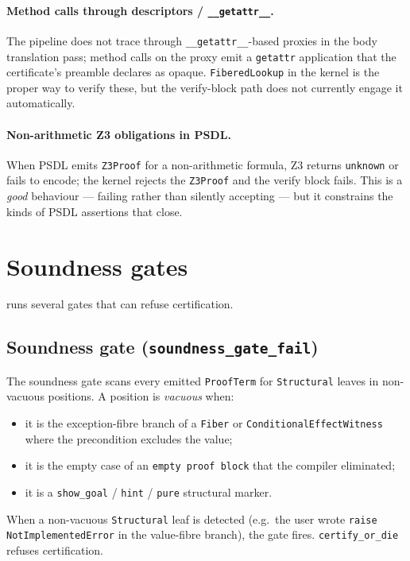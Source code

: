 \paragraph{Method calls through descriptors / \texttt{\_\_getattr\_\_}.}
The pipeline does not trace through \texttt{\_\_getattr\_\_}-based
proxies in the body translation pass; method calls on the proxy
emit a \texttt{getattr} application that the certificate's preamble
declares as opaque.  \texttt{FiberedLookup} in the kernel is the
proper way to verify these, but the verify-block path does not
currently engage it automatically.

\paragraph{Non-arithmetic Z3 obligations in PSDL.}  When PSDL emits
\texttt{Z3Proof} for a non-arithmetic formula, Z3 returns
\texttt{unknown} or fails to encode; the kernel rejects the
\texttt{Z3Proof} and the verify block fails.  This is a \emph{good}
behaviour --- failing rather than silently accepting --- but it
constrains the kinds of PSDL assertions that close.

\section{Soundness gates}
\label{sec:gates}

\Deppy{} runs several gates that can refuse certification.

\subsection{Soundness gate (\texttt{soundness\_gate\_fail})}

The soundness gate scans every emitted \texttt{ProofTerm} for
\texttt{Structural} leaves in non-vacuous positions.  A position
is \emph{vacuous} when:
\begin{itemize}[leftmargin=1.7em]
  \item it is the exception-fibre branch of a \texttt{Fiber} or
    \texttt{ConditionalEffectWitness} where the precondition
    excludes the value;
  \item it is the empty case of an \texttt{empty proof block} that
    the compiler eliminated;
  \item it is a \texttt{show\_goal} / \texttt{hint} / \texttt{pure}
    structural marker.
\end{itemize}

When a non-vacuous \texttt{Structural} leaf is detected (e.g.\ the
user wrote \texttt{raise NotImplementedError} in the value-fibre
branch), the gate fires.  \texttt{certify\_or\_die} refuses
certification.

